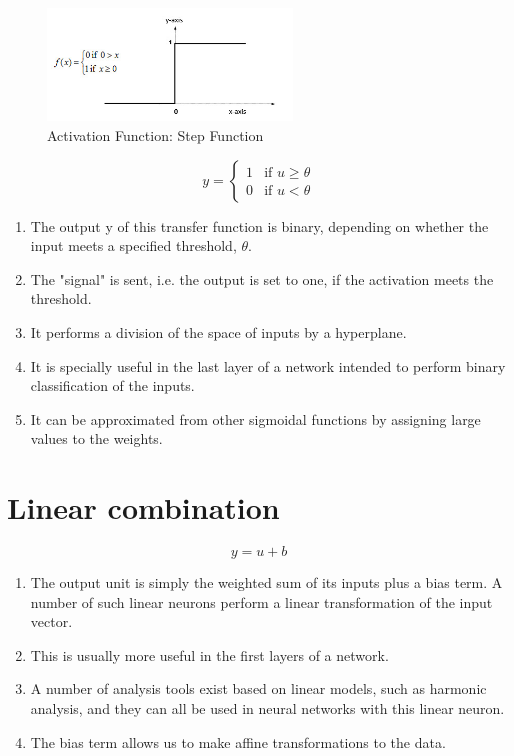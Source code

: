 \begin{figure}[H]
    \centering
    \includegraphics[height=3cm]{Pictures/activation-fns/step-function.jpg}
    \caption{Activation Function: Step Function}
\end{figure}

\[
    y={\begin{cases}1&{\text{if }}u\geq \theta \\0&{\text{if }}u<\theta \end{cases}}
\]

\begin{enumerate}
    \item The output y of this transfer function is binary, depending on whether the input meets a specified threshold, $\theta$. 
    \item The "signal" is sent, i.e. the output is set to one, if the activation meets the threshold.
    \item It performs a division of the space of inputs by a hyperplane. 
    \item It is specially useful in the last layer of a network intended to perform binary classification of the inputs. 
    \item It can be approximated from other sigmoidal functions by assigning large values to the weights.
\end{enumerate}


\section{Linear combination \cite{wiki-Artificial_neuron}}
\[
    y = u + b
\]

\begin{enumerate}
    \item The output unit is simply the weighted sum of its inputs plus a bias term. A number of such linear neurons perform a linear transformation of the input vector. 
    \item This is usually more useful in the first layers of a network. 
    \item A number of analysis tools exist based on linear models, such as harmonic analysis, and they can all be used in neural networks with this linear neuron. 
    \item The bias term allows us to make affine transformations to the data.
\end{enumerate}



